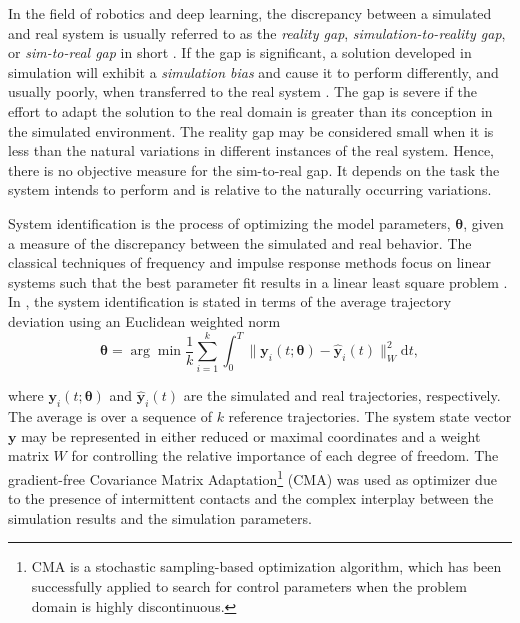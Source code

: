 \documentclass[10pt]{article}
\newcommand\norm[1]{\lVert#1\rVert}
\begin{document}
In the field of robotics and deep learning, the discrepancy between a simulated and real 
system is usually referred to as the \emph{reality gap}, \emph{simulation-to-reality gap}, or 
\emph{sim-to-real gap} in short \cite{zhao2020sim2real}. If the gap is significant,
a solution developed in simulation will exhibit a \emph{simulation bias} and cause it
to perform differently, and usually poorly, when transferred to the real system \cite{atkeson1997}.
The gap is severe if the effort to adapt the solution to the real domain is greater than
its conception in the simulated environment.  The reality gap may be considered small when it is 
less than the natural variations in different instances of the real system.
Hence, there is no objective measure for the sim-to-real gap.
It depends on the task the system intends to perform and is relative to the naturally
occurring variations. 

System identification is the process of optimizing the model parameters, $\bm{\theta}$, given a 
measure of the discrepancy between the simulated and real behavior. The classical techniques
of frequency and impulse response methods focus on linear systems such that the best parameter fit 
results in a linear least square problem \cite{soderstrom1989system}.  In \cite{tan2016}, 
the system identification is stated in terms of the average trajectory deviation using an Euclidean weighted norm  
\begin{equation}\label{eq:sysID}
  \bm{\theta} = \arg\min \frac{1}{k} \sum_{i=1}^k \int_0^{T}\norm{\bm{y}_i(t;\bm{\theta}) - \hat{\bm{y}}_i(t)}^2_W \text{d}t,
\end{equation}
																 
where $\bm{y}_i(t;\bm{\theta})$ and $\hat{\bm{y}}_i(t)$ are the simulated and real trajectories,
respectively. The average is over a sequence of $k$ reference trajectories.
The system state vector $\bm{y}$ may be represented in either reduced or maximal
coordinates and a weight matrix $W$ for controlling the 
relative importance of each degree of freedom. The gradient-free Covariance Matrix
Adaptation\footnote{CMA is a 
stochastic sampling-based optimization algorithm, which has
been successfully applied to search for control parameters
when the problem domain is highly discontinuous.} (CMA) was used as optimizer  
due to the presence of intermittent contacts and the complex interplay between the 
simulation results and the simulation parameters.
																					 
																							 
																								
\end{document}
